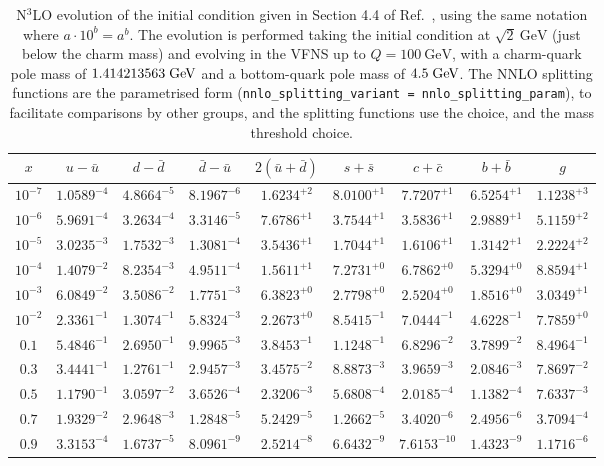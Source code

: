 \begin{table}[p]
  \small \centering
  \begin{tabular}{c|cccccccc}
    $x$ &  $u-\bar u$ &$d-\bar d$ &$\bar d-\bar u$ &  $ 2(\bar u+\bar d)$  &$s+\bar s$&$c+\bar c$ &$b+\bar b$  &   $g$\\
    \toprule
$10^{-7}$ &  $1.0589^{-4}$ &  $4.8664^{-5}$ &  $8.1967^{-6}$ &  $1.6234^{+2}$ &  $8.0100^{+1}$ &  $7.7207^{+1}$ &  $6.5254^{+1}$ &  $1.1238^{+3}$ \\
$10^{-6}$ &  $5.9691^{-4}$ &  $3.2634^{-4}$ &  $3.3146^{-5}$ &  $7.6786^{+1}$ &  $3.7544^{+1}$ &  $3.5836^{+1}$ &  $2.9889^{+1}$ &  $5.1159^{+2}$ \\
$10^{-5}$ &  $3.0235^{-3}$ &  $1.7532^{-3}$ &  $1.3081^{-4}$ &  $3.5436^{+1}$ &  $1.7044^{+1}$ &  $1.6106^{+1}$ &  $1.3142^{+1}$ &  $2.2224^{+2}$ \\
$10^{-4}$ &  $1.4079^{-2}$ &  $8.2354^{-3}$ &  $4.9511^{-4}$ &  $1.5611^{+1}$ &  $7.2731^{+0}$ &  $6.7862^{+0}$ &  $5.3294^{+0}$ &  $8.8594^{+1}$ \\
$10^{-3}$ &  $6.0849^{-2}$ &  $3.5086^{-2}$ &  $1.7751^{-3}$ &  $6.3823^{+0}$ &  $2.7798^{+0}$ &  $2.5204^{+0}$ &  $1.8516^{+0}$ &  $3.0349^{+1}$ \\
$10^{-2}$ &  $2.3361^{-1}$ &  $1.3074^{-1}$ &  $5.8324^{-3}$ &  $2.2673^{+0}$ &  $8.5415^{-1}$ &  $7.0444^{-1}$ &  $4.6228^{-1}$ &  $7.7859^{+0}$ \\
$0.1$    &  $5.4846^{-1}$ &  $2.6950^{-1}$ &  $9.9965^{-3}$ &  $3.8453^{-1}$ &  $1.1248^{-1}$ &  $6.8296^{-2}$ &  $3.7899^{-2}$ &  $8.4964^{-1}$ \\
$0.3$    &  $3.4441^{-1}$ &  $1.2761^{-1}$ &  $2.9457^{-3}$ &  $3.4575^{-2}$ &  $8.8873^{-3}$ &  $3.9659^{-3}$ &  $2.0846^{-3}$ &  $7.8697^{-2}$ \\
$0.5$    &  $1.1790^{-1}$ &  $3.0597^{-2}$ &  $3.6526^{-4}$ &  $2.3206^{-3}$ &  $5.6808^{-4}$ &  $2.0185^{-4}$ &  $1.1382^{-4}$ &  $7.6337^{-3}$ \\
$0.7$    &  $1.9329^{-2}$ &  $2.9648^{-3}$ &  $1.2848^{-5}$ &  $5.2429^{-5}$ &  $1.2662^{-5}$ &  $3.4020^{-6}$ &  $2.4956^{-6}$ &  $3.7094^{-4}$ \\
$0.9$    &  $3.3153^{-4}$ &  $1.6737^{-5}$ &  $8.0961^{-9}$ &  $2.5214^{-8}$ &  $6.6432^{-9}$ &  $7.6153^{-10}$ &  $1.4323^{-9}$ &  $1.1716^{-6}$ 
  \end{tabular}
  \caption{N$^3$LO evolution of the initial condition given in Section
    4.4 of Ref.~\cite{Dittmar:2005ed}, using the same notation where
    $a\cdot10^{b} = a^b$. The evolution is performed taking the
    initial condition at $\sqrt{2}~\text{GeV}$ (just below the charm
    mass) and evolving in the VFNS up to $Q=100~\text{GeV}$, with a
    charm-quark pole mass of $1.414213563\;\mathrm{GeV}$ and a bottom-quark
    pole mass of $4.5\;\mathrm{GeV}$.
    The NNLO splitting functions are the parametrised form
    (\texttt{nnlo\_splitting\_variant = nnlo\_splitting\_param}), to 
    facilitate comparisons by other groups, and the \ntlo splitting
    functions use the
     choice,
    and the  mass threshold choice.}
  \label{tab:n3lo-evolve}
\end{table}


